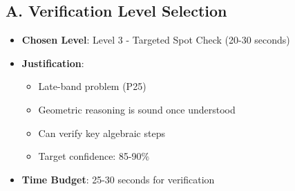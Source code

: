 \documentclass[12pt]{article}
\begin{document}
\begin{verificationbox}
\subsection*{A. Verification Level Selection}
\begin{itemize}[leftmargin=*]
    \item \textbf{Chosen Level}: Level 3 - Targeted Spot Check (20-30 seconds)
    \item \textbf{Justification}: 
    \begin{itemize}
        \item Late-band problem (P25)
        \item Geometric reasoning is sound once understood
        \item Can verify key algebraic steps
        \item Target confidence: 85-90\%
    \end{itemize}
    \item \textbf{Time Budget}: 25-30 seconds for verification
\end{itemize}


\end{verificationbox}
\end{document}
